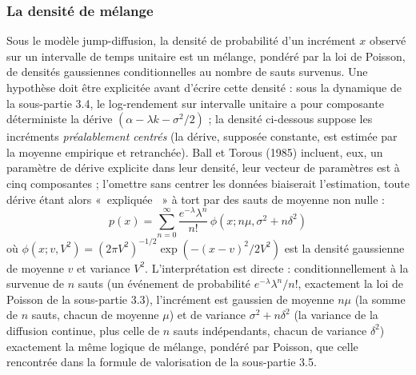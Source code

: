 \documentclass{article}
\providecommand{\og}{«~}
\providecommand{\fg}{~»}
\begin{document}
\subsubsection*{La densité de mélange}
Sous le modèle jump-diffusion, la densité de probabilité d'un incrément $x$ observé sur un intervalle de temps unitaire est un mélange, pondéré par la loi de Poisson, de densités gaussiennes conditionnelles au nombre de sauts survenus. Une hypothèse doit être explicitée avant d'écrire cette densité : sous la dynamique de la sous-partie 3.4, le log-rendement sur intervalle unitaire a pour composante déterministe la dérive $(\alpha-\lambda k-\sigma^2/2)$ ; la densité ci-dessous suppose les incréments \emph{préalablement centrés} (la dérive, supposée constante, est estimée par la moyenne empirique et retranchée). Ball et Torous (1985) incluent, eux, un paramètre de dérive explicite dans leur densité, leur vecteur de paramètres est à cinq composantes ; l'omettre sans centrer les données biaiserait l'estimation, toute dérive étant alors \og expliquée \fg{} à tort par des sauts de moyenne non nulle :
\begin{equation}
p(x) = \sum_{n=0}^{\infty} \frac{e^{-\lambda}\lambda^n}{n!}\, \phi(x; n\mu, \sigma^2 + n\delta^2)
\label{eq:mixture}
\end{equation}
où $\phi(x; v, V^2) = (2\pi V^2)^{-1/2}\exp\left(-(x-v)^2/2V^2\right)$ est la densité gaussienne de moyenne $v$ et variance $V^2$. L'interprétation est directe : conditionnellement à la survenue de $n$ sauts (un événement de probabilité $e^{-\lambda}\lambda^n/n!$, exactement la loi de Poisson de la sous-partie 3.3), l'incrément est gaussien de moyenne $n\mu$ (la somme de $n$ sauts, chacun de moyenne $\mu$) et de variance $\sigma^2+n\delta^2$ (la variance de la diffusion continue, plus celle de $n$ sauts indépendants, chacun de variance $\delta^2$) exactement la même logique de mélange, pondéré par Poisson, que celle rencontrée dans la formule de valorisation de la sous-partie 3.5.
\end{document}
